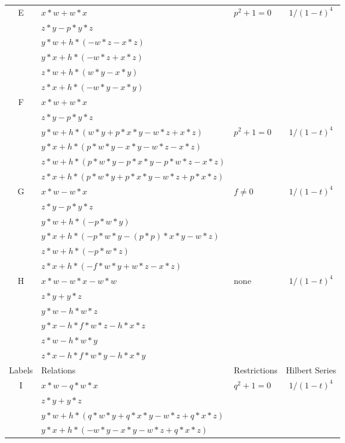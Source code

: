 \documentclass[12]{article}
\begin{document}
\begin{longtable}[c]{|c|p{5.75cm}|p{2.75cm}|c|}
\hline
E & $ x*w + w*x $ &\multirow{6}{*}{$ p^2+1=0 $} &\multirow{6}{*}{$ 1/(1-t)^4 $} \\ 
    & $  z*y - p*y*z $ & &  \\ 
   & $ y*w + h*(-w*z - x*z ) $ & & \\  
   & $ y*x + h*(-w*z + x*z ) $ & & \\  
   & $ z*w + h*(w*y - x*y ) $ & & \\ 
   & $  z*x + h*(-w*y - x*y ) $ & &  \\  
\hline
 F & $ x*w + w*x $ & & \\ 
    & $  z*y - p*y*z $ & &  \\  
   & $ y*w + h*(w*y + p*x*y - w*z + x*z) $ &  $ p^2+1=0 $ & $ 1/(1-t)^4 $ \\  
   & $  y*x + h*(p*w*y - x*y - w*z - x*z ) $ & & \\  
   & $ z*w + h*(p*w*y - p*x*y - p*w*z - x*z) $ & & \\ 
   & $ z*x + h*(p*w*y + p*x*y - w*z + p*x*z) $ & &  \\  
\hline
 G & $ x*w - w*x $ &\multirow{6}{*}{ $ f \neq 0 $ } &\multirow{6}{*}{$ 1/(1-t)^4 $} \\ 
    & $ z*y - p*y*z $ & &  \\ 
   & $ y*w + h*(-p*w*y) $ & & \\  
   & $ y*x + h*(-p*w*y - (p*p)*x*y - w*z) $ & & \\  
   & $ z*w + h*(-p*w*z) $ & & \\ 
   & $ z*x + h*(-f*w*y + w*z - x*z ) $ & &  \\  
\hline
 H & $ x*w - w*x - w*w $ &\multirow{6}{*}{none} &\multirow{6}{*}{$ 1/(1-t)^4 $} \\ 
    & $ z*y + y*z $ & &  \\ 
   & $ y*w - h*w*z $ & & \\  
   & $ y*x - h*f*w*z - h*x*z $ & & \\  
   & $ z*w - h*w*y $ & & \\ 
   & $ z*x - h*f*w*y - h*x*y $ & &  \\  
\hline
\pagebreak
\midrule[1.0pt]
Labels & Relations & Restrictions & Hilbert Series \\
\hline
 I & $ x*w - q*w*x $ &\multirow{6}{*}{$ q^2 + 1 = 0 $} &\multirow{6}{*}{$ 1/(1-t)^4 $} \\ 
    & $ z*y + y*z $ & &  \\ 
   & $ y*w + h*(q*w*y + q*x*y - w*z + q*x*z ) $ & & \\  
   & $ y*x + h*(-w*y - x*y - w*z + q*x*z ) $ & & \\  

\end{longtable}
\end{document}
